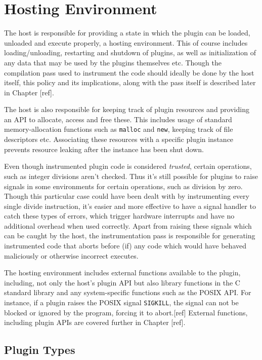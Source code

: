 \chapter {Hosting Environment}

The host is responsible for providing a state in which the plugin can be loaded,
unloaded and execute properly, a hosting environment. This of course includes
loading/unloading, restarting and shutdown of plugins, as well as initialization
of any data that may be used by the plugins themselves etc. Though the
compilation pass used to instrument the code should ideally be done by the host
itself, this policy and its implications, along with the pass itself is
described later in Chapter [ref].

The host is also responsible for keeping track of plugin resources and providing
an API to allocate, access and free these. This includes usage of standard
memory-allocation functions such as \texttt{malloc} and \texttt{new}, keeping
track of file descriptors etc. Associating these resources with a specific
plugin instance prevents resource leaking after the instance has been shut down.

Even though instrumented plugin code is considered \emph{trusted}, certain
operations, such as integer divisions aren't checked. Thus it's still possible
for plugins to raise signals in some environments for certain operations, such
as division by zero. Though this particular case could have been dealt with by
instrumenting every single divide instruction, it's easier and more effective to
have a signal handler to catch these types of errors, which trigger hardware
interrupts and have no additional overhead when used correctly. Apart from
raising these signals which can be caught by the host, the instrumentation pass
is responsible for generating instrumented code that aborts before (if) any
code which would have behaved maliciously or otherwise incorrect executes.

The hosting environment includes external functions available to the plugin,
including, not only the host's plugin API but also library functions in the C
standard library and any system-specific functions such as the POSIX API. For
instance, if a plugin raises the POSIX signal \texttt{SIGKILL}, the signal can
not be blocked or ignored by the program, forcing it to abort.[ref] External
functions, including plugin APIs are covered further in Chapter [ref].


\section {Plugin Types}

